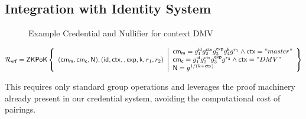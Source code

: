 \subsection{Integration with Identity System}


\begin{figure}
        \begin{pchstack}[boxed, center, space=4em]
            \begin{pcvstack}
            \end{pcvstack}
            \pcvspace
            \begin{pcvstack}
            \end{pcvstack}
            \begin{pcvstack}
            \end{pcvstack}
        \end{pchstack}
    \caption{Example Credential and Nullifier for context DMV}
    \label{fig:two-creds}
\end{figure}


\[
    \mathcal{R}_{\mathsf{vrf}} = {\mathsf{ZKPoK}} \left\{ 
    \begin{array}{l} 
    (\mathsf{cm_m}, \mathsf{cm_c}, \mathsf{N}), (\mathsf{id}, \mathsf{ctx}, , \mathsf{exp}, \mathsf{k}, r_1, r_2) \\
    \end{array} 
    \middle|
    \begin{array}{l}
        \mathsf{cm_m} = g_1^{\mathsf{id}}g_2^{\mathsf{ctx}}g_3^{\mathsf{exp}}g_4^{\mathsf{k}}g^{r_1}  \wedge \mathsf{ctx}="master" \\
        \mathsf{cm_c} = g_1^{\mathsf{id}}g_2^{\mathsf{ctx}}g_3^{\mathsf{exp}}g^{r_2} \wedge \mathsf{ctx}="DMV" \\
        \mathsf{N} = g^{1/(k + \mathsf{ctx})}
    \end{array} 
    \right\}
\]
    

This requires only standard group operations and leverages the proof machinery already present in our credential system, avoiding the computational cost of pairings.












